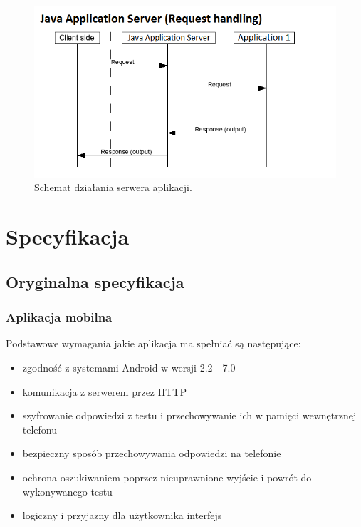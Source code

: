 \documentclass[eng]{mgr}
\begin{document}
			\begin{center}
				\begin{figure}[ht]
					\centering
					\includegraphics[scale=0.7]{flow_jas.png}
					\caption{Schemat działania serwera aplikacji.}
				\end{figure}
			\end{center}
	
	\chapter{Specyfikacja}
	
		\section{Oryginalna specyfikacja}
		
			\subsection{Aplikacja mobilna}
			Podstawowe wymagania jakie aplikacja ma spełniać są następujące:
			\begin{itemize}
				\item zgodność z systemami Android w wersji 2.2 - 7.0
				\item komunikacja z serwerem przez HTTP
				\item szyfrowanie odpowiedzi z testu i przechowywanie ich w pamięci wewnętrznej telefonu
				\item bezpieczny sposób przechowywania odpowiedzi na telefonie
				\item ochrona oszukiwaniem poprzez nieuprawnione wyjście i powrót do wykonywanego testu
				\item logiczny i przyjazny dla użytkownika interfejs
			\end{itemize}
		
\end{document}
